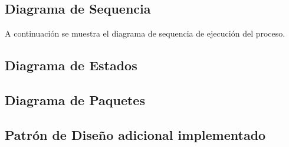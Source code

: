 \documentclass[10pt]{article} %
\begin{document}
\subsection{Diagrama de Sequencia}
A continuación se muestra el diagrama de sequencia de ejecución del proceso.
\begin{figure}[H] %
\label{fig:DiagramaDeSecuencia}
\end{figure}

\subsection{Diagrama de Estados}

\subsection{Diagrama de Paquetes}

\subsection{Patrón de Diseño adicional implementado}
\end{document}

